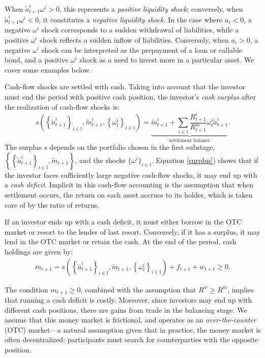 \documentclass[12pt,american,english,notitlepage]{article}
\begin{document}
When $\tilde{a}_{t+1}^{i}\omega^{i}>0$, this represents a \textit{positive
liquidity shock}; conversely, when $\tilde{a}_{t+1}^{i}\omega^{i}<0$,
it constitutes a \textit{negative liquidity shock}. In the case where
$a_{i}<0$, a negative $\omega^{i}$ shock corresponds to a sudden
withdrawal of liabilities, while a positive $\omega^{i}$ shock reflects
a sudden inflow of liabilities. Conversely, when $a_{i}>0$, a negative
$\omega^{i}$ shock can be interpreted as the prepayment of a loan
or callable bond, and a positive $\omega^{i}$ shock as a need to
invest more in a particular asset. We cover some examples below.

Cash-flow shocks are settled with cash. Taking into account that the
investor must end the period with positive cash position, the investor's
\textit{cash surplus} after the realization of cash-flow shocks is:
\begin{equation}
s\left(\left\{ \tilde{a}_{t+1}^{i}\right\} _{i\in\mathbb{I}},\tilde{m}_{t+1}^{i},\left\{ \omega_{t}^{i}\right\} _{i\in\mathbb{I}}\right)=\underbrace{\tilde{m}_{t+1}^{i}+\sum_{i\in\mathbb{I}}\frac{R_{t+1}^{i}}{R_{t+1}^{m}}\omega_{t}^{i}\tilde{a}_{t+1}^{i}}_{\text{settlement balance}}.\label{eq:surplus}
\end{equation}
The surplus $s$ depends on the portfolio chosen in the first substage,
$\left\{ \left\{ \tilde{a}_{t+1}^{i}\right\} _{i\in\mathbb{I}},\tilde{m}_{t+1}\right\} $,
and the shocks $\{\omega^{i}\}_{i\in\mathbb{I}}$. Equation \eqref{surplus})
shows that if the investor faces sufficiently large negative cash-flow shocks, it may end up with a \textit{cash deficit}. Implicit in this cash-flow accounting is the assumption that when settlement occurs, the return on each asset accrues to its holder, which is taken care of by the ratio of returns. 

If an investor ends up with a cash deficit, it must either borrow
in the OTC market or resort to the lender of last resort. Conversely,
if it has a surplus, it may lend in the OTC market or retain the cash.
At the end of the period, cash holdings are given by: 
\begin{align}
m_{t+1}=s\left(\left\{ \tilde{a}_{t+1}^{i}\right\} _{i\in\mathbb{I}},\tilde{m}_{t+1},\left\{ \omega_{t}^{i}\right\} _{i\in\mathbb{I}}\right)+f_{t+1}+w_{t+1}\ge0.\label{eq:res_motion}
\end{align}

The condition $m_{t+1}\ge0$, combined with the assumption that $R^{w}\ge R^{m}$,
implies that running a cash deficit is costly. Moreover, since investors
may end up with different cash positions, there are gains from trade
in the balancing stage. We assume that this money market is frictional,
and operates as an \emph{over-the-counter} (OTC) market---a natural
assumption given that in practice, the money market is often decentralized: participants must search for counterparties with the opposite position.
\end{document}
